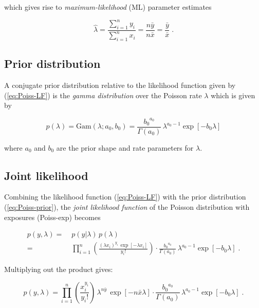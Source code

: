 which gives rise to \textit{maximum-likelihood} (ML) parameter estimates

\begin{equation} \label{eq:Poiss-MLE}
\hat{\lambda} = \frac{\sum_{i=1}^n y_i}{\sum_{i=1}^n x_i} = \frac{n \bar{y}}{n \bar{x}} = \frac{\bar{y}}{\bar{x}} \; .
\end{equation}


\subsection{Prior distribution} \label{sec:Poiss-prior}

A conjugate prior distribution relative to the likelihood function given by (\ref{eq:Poiss-LF}) is the \textit{gamma distribution} over the Poisson rate $\lambda$ which is given by

\begin{equation} \label{eq:Poiss-prior}
p(\lambda) = \mathrm{Gam}(\lambda; a_0, b_0) = \frac{{b_0}^{a_0}}{\Gamma(a_0)} \, \lambda^{a_0-1} \exp[-b_0 \lambda]
\end{equation}

where $a_0$ and $b_0$ are the prior shape and rate parameters for $\lambda$.


\subsection{Joint likelihood} \label{sec:Poiss-JL}

Combining the likelihood function (\ref{eq:Poiss-LF}) with the prior distribution (\ref{eq:Poiss-prior}), the \textit{joint likelihood function} of the Poisson distribution with exposures (Poiss-exp) becomes

\vspace{-0.5em}
\begin{equation} \label{eq:Poiss-JL1}
\begin{split}
p(y,\lambda) = \; & p(y|\lambda) \, p(\lambda) \\
= \; & \prod_{i=1}^n \left( \frac{(\lambda x_i)^{y_i} \, \exp[-\lambda x_i]}{y_i !} \right) \cdot \frac{{b_0}^{a_0}}{\Gamma(a_0)} \, \lambda^{a_0-1} \exp[-b_0 \lambda] \; .
\end{split}
\end{equation}

Multiplying out the product gives:

\begin{equation} \label{eq:Poiss-JL2}
p(y,\lambda) = \prod_{i=1}^n \left( \frac{x_i^{y_i}}{y_i !} \right) \, \lambda^{n \bar{y}} \, \exp[-n \bar{x} \lambda] \cdot \frac{{b_0}^{a_0}}{\Gamma(a_0)} \, \lambda^{a_0-1} \exp[-b_0 \lambda] \; .
\end{equation}

